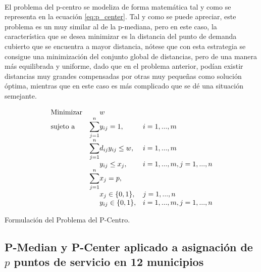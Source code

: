 \documentclass[spanish]{article}
\begin{document}
		\paragraph{}
		El problema del p-centro se modeliza de forma matemática tal y como se representa en la ecuación \ref{eq:p_center}. Tal y como se puede apreciar, este problema es un muy similar al de la p-mediana, pero en este caso, la característica que se desea minimizar es la distancia del punto de demanda cubierto que se encuentra a mayor distancia, nótese que con esta estrategia se consigue una minimización del conjunto global de distancias, pero de una manera más equilibrada y uniforme, dado que en el problema anterior, podían existir distancias muy grandes compensadas por otras muy pequeñas como solución óptima, mientras que en este caso es más complicado que se dé una situación semejante.

		\begin{eqfloat}
			\begin{equation}
				\begin{array}{ll@{}ll}
					\text{Minimizar}
						& 																 		& w	&							\\
					\text{sujeto a}
						& \displaystyle\sum\limits_{j = 1}^n 	& y_{ij} = 1,		&i=1 ,..., m	\\
						& \displaystyle\sum\limits_{j = 1}^n 	& d_{ij}y_{ij} \leq w,  		& i=1 ,..., m \\
						& 																	 	& y_{ij} \leq x_{j},  		& i=1 ,..., m,j=1 ,..., n  \\
						& \displaystyle\sum\limits_{j = 1}^n 	& x_{j} = p,  		& 						\\
						&                                     &	x_{j} \in \{0,1\},&j=1 ,..., n 	\\
						&                                     &	y_{ij} \in \{0,1\},&i=1 ,..., m, j=1 ,..., n  \\
				\end{array}
			\end{equation}
			\caption{Formulación del Problema del P-Centro.}
      \label{eq:p_center}
    \end{eqfloat}


		\subsection{P-Median y P-Center aplicado a asignación de $p$ puntos de servicio en 12 municipios}
		\label{sec:5.1}
\end{document}
